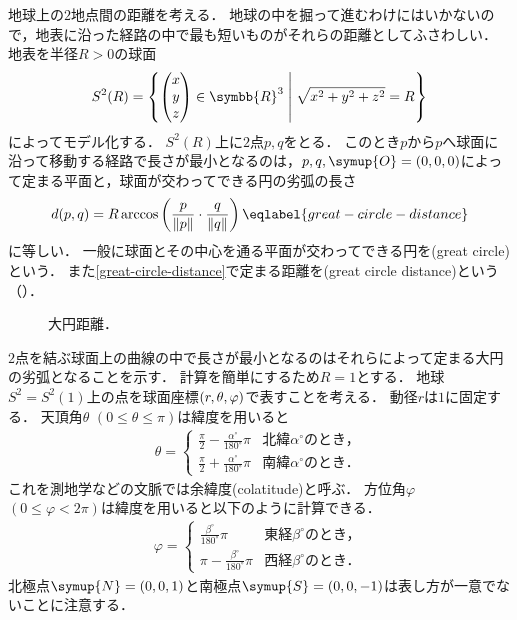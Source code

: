 \documentclass{ltjsbook}
\begin{document}
\begin{specialexample}
地球上の\(2\)地点間の距離を考える．
地球の中を掘って進むわけにはいかないので，地表に沿った経路の中で最も短いものがそれらの距離としてふさわしい．
地表を半径\(R > 0\)の球面
\begin{align*}
    S^2(R) = \left\{ \begin{pmatrix} x \\ y \\ z \end{pmatrix} \in \symbb{R}^3 \relmiddle{|} \sqrt{x^2 + y^2 + z^2} = R \right\}
\end{align*}
によってモデル化する．
\(S^2(R)\)上に\(2\)点\(p, q\)をとる．
このとき\(p\)から\(p\)へ球面に沿って移動する経路で長さが最小となるのは，\(p, q, \symup{O} = (0, 0, 0)\)によって定まる平面と，球面が交わってできる円の劣弧の長さ
\begin{align}
    d(p, q) = R \arccos\left(\frac{p}{\lVert p \rVert} \cdot \frac{q}{\lVert q \rVert}\right) \eqlabel{great-circle-distance}
\end{align}
に等しい．
一般に球面とその中心を通る平面が交わってできる円を(great circle)という．
また\eqref{great-circle-distance}で定まる距離を(great circle distance)という（）．
\begin{figure}
    \centering
    
    \caption{大円距離．}
\end{figure}

\(2\)点を結ぶ球面上の曲線の中で長さが最小となるのはそれらによって定まる大円の劣弧となることを示す．
計算を簡単にするため\(R = 1\)とする．
地球\(S^2 = S^2(1)\)上の点を球面座標\((r, \theta, \varphi)\)で表すことを考える．
動径\(r\)は\(1\)に固定する．
天頂角\(\theta\) \((0 \leq \theta \leq \pi)\)は緯度を用いると
\begin{align*}
    \theta = \begin{cases}
        \displaystyle
        \frac{\pi}{2} - \frac{\alpha^\circ}{180^\circ} \pi
        & \text{北緯\(\alpha^\circ\)のとき，} \\[10pt]
        \displaystyle
        \frac{\pi}{2} + \frac{\alpha^\circ}{180^\circ} \pi
        & \text{南緯\(\alpha^\circ\)のとき．}
    \end{cases}
\end{align*}
これを測地学などの文脈では余緯度(colatitude)と呼ぶ．
方位角\(\varphi\) \((0 \leq \varphi < 2\pi)\)は緯度を用いると以下のように計算できる．
\begin{align*}
    \varphi = \begin{cases}
        \displaystyle
        \frac{\beta^\circ}{180^\circ} \pi
        & \text{東経\(\beta^\circ\)のとき，} \\[10pt]
        \displaystyle
        \pi - \frac{\beta^\circ}{180^\circ} \pi
        & \text{西経\(\beta^\circ\)のとき．}
    \end{cases}
\end{align*}
北極点\(\symup{N} = (0, 0, 1)\)と南極点\(\symup{S} = (0, 0, -1)\)は表し方が一意でないことに注意する．


\end{specialexample}
\end{document}

